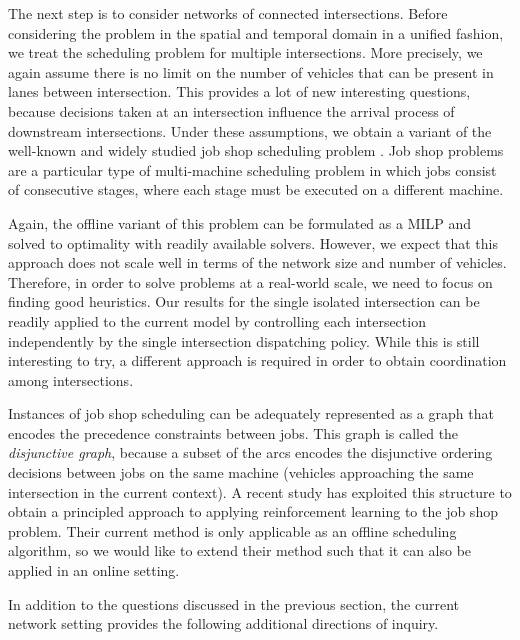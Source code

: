 \documentclass{article}
\begin{document}
The next step is to consider networks of connected intersections. Before
considering the problem in the spatial and temporal domain in a unified fashion,
we treat the scheduling problem for multiple intersections. More precisely, we
again assume there is no limit on the number of vehicles that can be present in
lanes between intersection. This provides a lot of new interesting questions,
because decisions taken at an intersection influence the arrival process of
downstream intersections. Under these assumptions, we obtain a variant of the
well-known and widely studied job shop scheduling problem
\cite{pinedo_scheduling_2016}. Job shop problems are a particular type of
multi-machine scheduling problem in which jobs consist of consecutive stages,
where each stage must be executed on a different machine.


Again, the offline variant of this problem can be formulated as a MILP and
solved to optimality with readily available solvers. However, we expect that
this approach does not scale well in terms of the network size and number of
vehicles. Therefore, in order to solve problems at a real-world scale, we need
to focus on finding good heuristics. Our results for the single isolated
intersection can be readily applied to the current model by controlling each
intersection independently by the single intersection dispatching policy. While
this is still interesting to try, a different approach is required in order to
obtain coordination among intersections.


Instances of job shop scheduling can be adequately represented as a graph that
encodes the precedence constraints between jobs. This graph is called the
\textit{disjunctive graph}, because a subset of the arcs encodes the disjunctive
ordering decisions between jobs on the same machine (vehicles approaching the
same intersection in the current context). A recent study
\cite{zhang_learning_2020} has exploited this structure to obtain a principled
approach to applying reinforcement learning to the job shop problem. Their
current method is only applicable as an offline scheduling algorithm, so we
would like to extend their method such that it can also be applied in an
online setting.

In addition to the questions discussed in the previous section, the current
network setting provides the following additional directions of inquiry.
\end{document}
